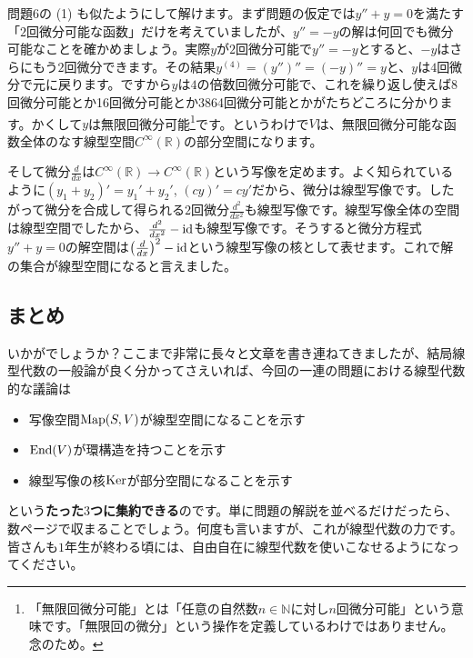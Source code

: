 問題6の (1) も似たようにして解けます。まず問題の仮定では$y'' + y= 0$を満たす「$2$回微分可能な函数」だけを考えていましたが、$y'' = -y$の解は何回でも微分可能なことを確かめましょう。実際$y$が$2$回微分可能で$y'' = -y$とすると、$-y$はさらにもう$2$回微分できます。その結果$y^{(4)} = (y'')'' = (-y)'' = y$と、$y$は$4$回微分で元に戻ります。ですから$y$は$4$の倍数回微分可能で、これを繰り返し使えば8回微分可能とか16回微分可能とか3864回微分可能とかがたちどころに分かります。かくして$y$は無限回微分可能\footnote{「無限回微分可能」とは「任意の自然数$n\in\mathbb{N}$に対し$n$回微分可能」という意味です。「無限回の微分」という操作を定義しているわけではありません。念のため。}です。というわけで$V$は、無限回微分可能な函数全体のなす線型空間$C^{\infty}(\mathbb{R})$の部分空間になります。

そして微分$\frac{d}{dx}$は$C^{\infty}(\mathbb{R}) \rightarrow C^{\infty}(\mathbb{R})$という写像を定めます。よく知られているように$(y_1 + y_2)' = y_1' + y_2'$, $(cy)' = cy'$だから、微分は線型写像です。したがって微分を合成して得られる$2$回微分$\frac{d^2}{dx^2}$も線型写像です。線型写像全体の空間は線型空間でしたから、$\frac{d^2}{dx^2}-\operatorname{id}$も線型写像です。そうすると微分方程式$y'' + y = 0$の解空間は$\bigl(\frac{d}{dx}\bigr)^2 - \operatorname{id}$という線型写像の核として表せます。これで解の集合が線型空間になると言えました。

\subsection{まとめ}

いかがでしょうか？ここまで非常に長々と文章を書き連ねてきましたが、結局線型代数の一般論が良く分かってさえいれば、今回の一連の問題における線型代数的な議論は
\begin{itemize}
\item 写像空間$\operatorname{Map}(S, V)$が線型空間になることを示す
\item $\operatorname{End}(V)$が環構造を持つことを示す
\item 線型写像の核$\operatorname{Ker}$が部分空間になることを示す
\end{itemize}
という\textbf{たった$3$つに集約できる}のです。単に問題の解説を並べるだけだったら、数ページで収まることでしょう。何度も言いますが、これが線型代数の力です。皆さんも$1$年生が終わる頃には、自由自在に線型代数を使いこなせるようになってください。

